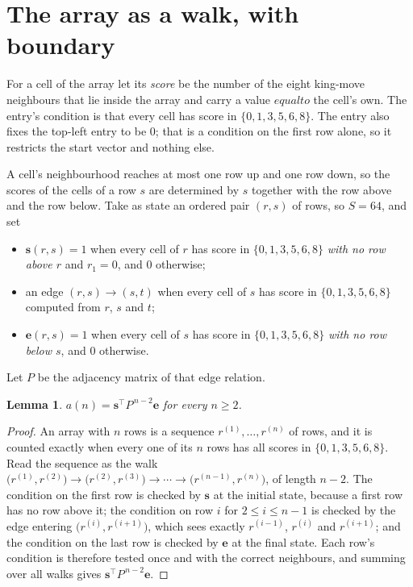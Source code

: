 \documentclass[11pt,a4paper]{article}
\theoremstyle{plain}
\newtheorem{lemma}[theorem]{Lemma}
\theoremstyle{definition}
\begin{document}
\section{The array as a walk, with boundary}

For a cell of the array let its \emph{score} be the number of the eight king-move neighbours that lie inside
the array and carry a value $equal to$ the cell's own. The entry's condition is that every cell
has score in $\{0,1,3,5,6,8\}$. The entry also fixes the top-left entry to be $0$; that is a condition on the first row alone, so it restricts the start vector and nothing else.

A cell's neighbourhood reaches at most one row up and one row down, so the scores of the
cells of a row $s$ are determined by $s$ together with the row above and the row below.
Take as state an ordered pair $(r,s)$ of rows, so $S=64$, and set
\begin{itemize}
\item $\mathbf{s}(r,s)=1$ when every cell of $r$ has score in $\{0,1,3,5,6,8\}$ \emph{with no row
above $r$} and $r_1=0$, and $0$ otherwise;
\item an edge $(r,s)\to(s,t)$ when every cell of $s$ has score in $\{0,1,3,5,6,8\}$ computed from
$r$, $s$ and $t$;
\item $\mathbf{e}(r,s)=1$ when every cell of $s$ has score in $\{0,1,3,5,6,8\}$ \emph{with no row
below $s$}, and $0$ otherwise.
\end{itemize}
Let $P$ be the adjacency matrix of that edge relation.

\begin{lemma}\label{lem:walk}
$a(n)=\mathbf{s}^{\!\top}P^{\,n-2}\mathbf{e}$ for every $n\ge2$.
\end{lemma}

\begin{proof}
An array with $n$ rows is a sequence $r^{(1)},\dots,r^{(n)}$ of rows, and it is counted
exactly when every one of its $n$ rows has all scores in $\{0,1,3,5,6,8\}$. Read the sequence as the
walk $\bigl(r^{(1)},r^{(2)}\bigr)\to\bigl(r^{(2)},r^{(3)}\bigr)\to\cdots\to
\bigl(r^{(n-1)},r^{(n)}\bigr)$, of length $n-2$. The condition on the first row is
checked by $\mathbf{s}$ at the initial state, because a first row has no row above it; the
condition on row $i$ for $2\le i\le n-1$ is checked by the edge entering
$\bigl(r^{(i)},r^{(i+1)}\bigr)$, which sees exactly $r^{(i-1)}$, $r^{(i)}$ and
$r^{(i+1)}$; and the condition on the last row is checked by $\mathbf{e}$ at the final
state. Each row's condition is therefore tested once and with the correct neighbours, and
summing over all walks gives $\mathbf{s}^{\!\top}P^{\,n-2}\mathbf{e}$.
\end{proof}
\end{document}
